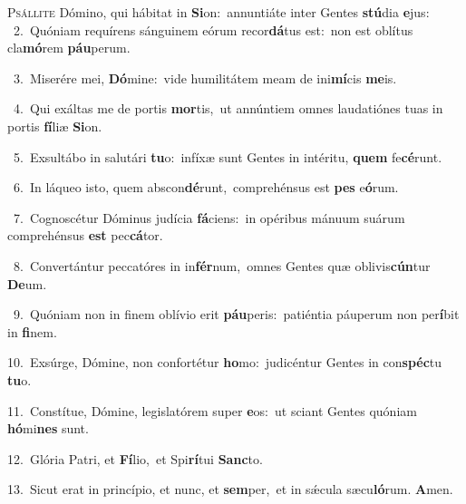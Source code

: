 \lettrine{\initial\textcolor{\initialcolor}{P}}{sállite} Dómino, qui hábitat in \textbf{Si}\-on:~\star annuntiáte inter Gentes \textbf{stú}\-dia \textbf{e}\-jus:\\
{\numbfont\textcolor{\numbcolor}{~2.}}~Quóniam requírens sánguinem eórum recor\-\textbf{dá}\-tus est:~\star non est oblítus cla\-\textbf{mó}\-rem \textbf{páu}\-perum.\par
{\numbfont\textcolor{\numbcolor}{~3.}}~Miserére mei, \textbf{Dó}\-mine:~\star vide humilitátem meam de ini\-\textbf{mí}\-cis \textbf{me}\-is.\par
{\numbfont\textcolor{\numbcolor}{~4.}}~Qui exáltas me de portis \textbf{mor}\-tis,~\star ut annúntiem omnes laudatiónes tuas in portis \textbf{fí}\-liæ \textbf{Si}\-on.\par
{\numbfont\textcolor{\numbcolor}{~5.}}~Exsultábo in salutári \textbf{tu}\-o:~\star infíxæ sunt Gentes in intéritu, \textbf{quem} fe\-\textbf{cé}\-runt.\par
{\numbfont\textcolor{\numbcolor}{~6.}}~In láqueo isto, quem abscon\-\textbf{dé}\-runt,~\star comprehénsus est \textbf{pes} e\-\textbf{ó}\-rum.\par
{\numbfont\textcolor{\numbcolor}{~7.}}~Cognoscétur Dóminus judícia \textbf{fá}\-ciens:~\star in opéribus mánuum suárum comprehénsus \textbf{est} pec\-\textbf{cá}\-tor.\par
{\numbfont\textcolor{\numbcolor}{~8.}}~Convertántur peccatóres in in\-\textbf{fér}\-num,~\star omnes Gentes quæ oblivis\-\textbf{cún}\-tur \textbf{De}\-um.\par
{\numbfont\textcolor{\numbcolor}{~9.}}~Quóniam non in finem oblívio erit \textbf{páu}\-peris:~\star patiéntia páuperum non per\-\textbf{í}\-bit in \textbf{fi}\-nem.\par
{\numbfont\textcolor{\numbcolor}{10.}}~Exsúrge, Dómine, non confortétur \textbf{ho}\-mo:~\star judicéntur Gentes in con\-\textbf{spéc}\-tu \textbf{tu}\-o.\par
{\numbfont\textcolor{\numbcolor}{11.}}~Constítue, Dómine, legislatórem super \textbf{e}\-os:~\star ut sciant Gentes quóniam \textbf{hó}\-mi\textbf{nes} sunt.\par
{\numbfont\textcolor{\numbcolor}{12.}}~Glória Patri, et \textbf{Fí}\-lio,~\star et Spi\-\textbf{rí}\-tui \textbf{Sanc}\-to.\par
{\numbfont\textcolor{\numbcolor}{13.}}~Sicut erat in princípio, et nunc, et \textbf{sem}\-per,~\star et in sǽcula sæcu\-\textbf{ló}\-rum. \textbf{A}\-men.\par
